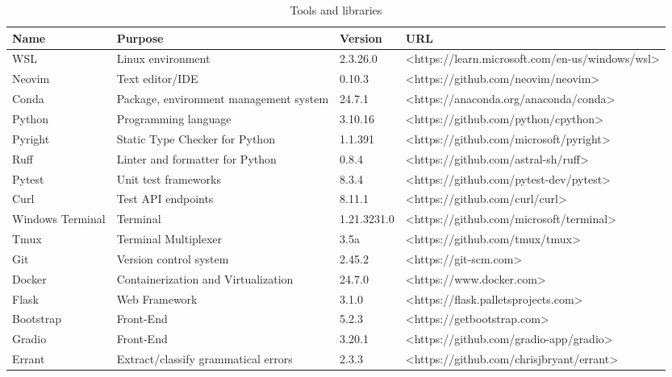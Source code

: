 \begin{sidewaystable}[htbp]
  \caption{Tools and libraries}\label{tab:tools}
  \raggedleft
  \begin{tabular}{|l|l|l|l|}
    \hline
    Name             & Purpose                                & Version     & URL                                             \\ \hline
    WSL              & Linux environment                      & 2.3.26.0    & <https://learn.microsoft.com/en-us/windows/wsl> \\ \hline
    Neovim           & Text editor/IDE                        & 0.10.3      & <https://github.com/neovim/neovim>              \\ \hline
    Conda            & Package, environment management system & 24.7.1      & <https://anaconda.org/anaconda/conda>           \\ \hline
    Python           & Programming language                   & 3.10.16     & <https://github.com/python/cpython>             \\ \hline
    Pyright          & Static Type Checker for Python         & 1.1.391     & <https://github.com/microsoft/pyright>          \\ \hline
    Ruff             & Linter and formatter for Python        & 0.8.4       & <https://github.com/astral-sh/ruff>             \\ \hline
    Pytest           & Unit test frameworks                   & 8.3.4       & <https://github.com/pytest-dev/pytest>          \\ \hline
    Curl             & Test API endpoints                     & 8.11.1      & <https://github.com/curl/curl>                  \\ \hline
    Windows Terminal & Terminal                               & 1.21.3231.0 & <https://github.com/microsoft/terminal>         \\ \hline
    Tmux             & Terminal Multiplexer                   & 3.5a        & <https://github.com/tmux/tmux>                  \\ \hline
    Git              & Version control system                 & 2.45.2      & <https://git-scm.com>                           \\ \hline
    Docker           & Containerization and Virtualization    & 24.7.0      & <https://www.docker.com>                        \\ \hline
    Flask            & Web Framework                          & 3.1.0       & <https://flask.palletsprojects.com>             \\ \hline
    Bootstrap        & Front-End                              & 5.2.3       & <https://getbootstrap.com>                      \\ \hline
    Gradio           & Front-End                              & 3.20.1      & <https://github.com/gradio-app/gradio>          \\ \hline
    Errant           & Extract/classify grammatical errors    & 2.3.3       & <https://github.com/chrisjbryant/errant>        \\ \hline
  \end{tabular}
\end{sidewaystable}

